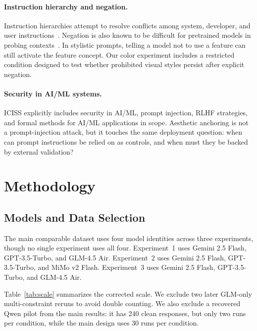 \documentclass[runningheads,a4paper]{llncs}
\begin{document}
\paragraph{Instruction hierarchy and negation.}
Instruction hierarchies attempt to resolve conflicts among system, developer, and user instructions~\cite{wu2024hierarchy}. Negation is also known to be difficult for pretrained models in probing contexts~\cite{kassner2020negation}. In stylistic prompts, telling a model not to use a feature can still activate the feature concept. Our color experiment includes a restricted condition designed to test whether prohibited visual styles persist after explicit negation.

\paragraph{Security in AI/ML systems.}
ICISS explicitly includes security in AI/ML, prompt injection, RLHF strategies, and formal methods for AI/ML applications in scope. Aesthetic anchoring is not a prompt-injection attack, but it touches the same deployment question: when can prompt instructions be relied on as controls, and when must they be backed by external validation?

\section{Methodology}

\subsection{Models and Data Selection}

The main comparable dataset uses four model identities across three experiments, though no single experiment uses all four. Experiment~1 uses Gemini 2.5 Flash, GPT-3.5-Turbo, and GLM-4.5 Air. Experiment~2 uses Gemini 2.5 Flash, GPT-3.5-Turbo, and MiMo v2 Flash. Experiment~3 uses Gemini 2.5 Flash, GPT-3.5-Turbo, and GLM-4.5 Air.

Table~\ref{tab:scale} summarizes the corrected scale. We exclude two later GLM-only multi-constraint reruns to avoid double counting. We also exclude a recovered Qwen pilot from the main results: it has 240 clean responses, but only two runs per condition, while the main design uses 30 runs per condition.
\end{document}
